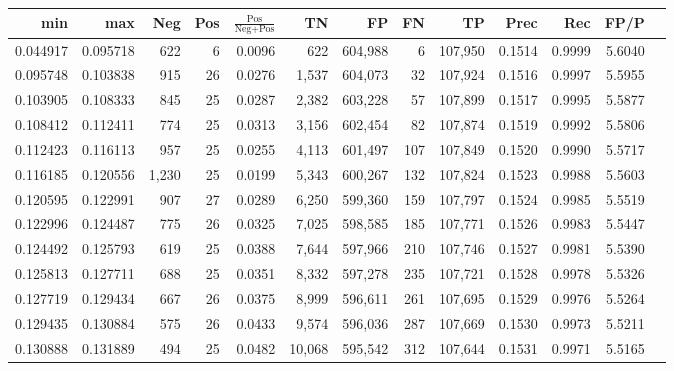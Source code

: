 \begin{tabular}{rrrrrrrrrrrrr}
\toprule
     min &      max &   Neg & Pos & $\frac{\text{Pos}}{\text{Neg}+\text{Pos}}$ &      TN &      FP &      FN &      TP &   Prec &    Rec &   FP/P \\
\midrule
0.044917 & 0.095718 &   622 &   6 &                                     0.0096 &     622 & 604,988 &       6 & 107,950 & 0.1514 & 0.9999 & 5.6040 \\
0.095748 & 0.103838 &   915 &  26 &                                     0.0276 &   1,537 & 604,073 &      32 & 107,924 & 0.1516 & 0.9997 & 5.5955 \\
0.103905 & 0.108333 &   845 &  25 &                                     0.0287 &   2,382 & 603,228 &      57 & 107,899 & 0.1517 & 0.9995 & 5.5877 \\
0.108412 & 0.112411 &   774 &  25 &                                     0.0313 &   3,156 & 602,454 &      82 & 107,874 & 0.1519 & 0.9992 & 5.5806 \\
0.112423 & 0.116113 &   957 &  25 &                                     0.0255 &   4,113 & 601,497 &     107 & 107,849 & 0.1520 & 0.9990 & 5.5717 \\
0.116185 & 0.120556 & 1,230 &  25 &                                     0.0199 &   5,343 & 600,267 &     132 & 107,824 & 0.1523 & 0.9988 & 5.5603 \\
0.120595 & 0.122991 &   907 &  27 &                                     0.0289 &   6,250 & 599,360 &     159 & 107,797 & 0.1524 & 0.9985 & 5.5519 \\
0.122996 & 0.124487 &   775 &  26 &                                     0.0325 &   7,025 & 598,585 &     185 & 107,771 & 0.1526 & 0.9983 & 5.5447 \\
0.124492 & 0.125793 &   619 &  25 &                                     0.0388 &   7,644 & 597,966 &     210 & 107,746 & 0.1527 & 0.9981 & 5.5390 \\
0.125813 & 0.127711 &   688 &  25 &                                     0.0351 &   8,332 & 597,278 &     235 & 107,721 & 0.1528 & 0.9978 & 5.5326 \\
0.127719 & 0.129434 &   667 &  26 &                                     0.0375 &   8,999 & 596,611 &     261 & 107,695 & 0.1529 & 0.9976 & 5.5264 \\
0.129435 & 0.130884 &   575 &  26 &                                     0.0433 &   9,574 & 596,036 &     287 & 107,669 & 0.1530 & 0.9973 & 5.5211 \\
0.130888 & 0.131889 &   494 &  25 &                                     0.0482 &  10,068 & 595,542 &     312 & 107,644 & 0.1531 & 0.9971 & 5.5165 \\

\end{tabular}
